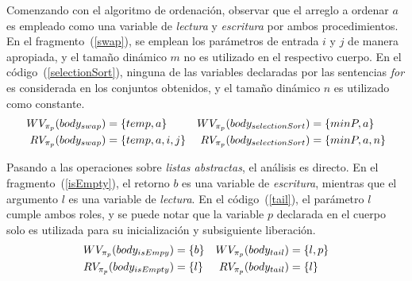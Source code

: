 Comenzando con el algoritmo de ordenación, observar que el arreglo a ordenar $a$ es empleado como una variable de \textit{lectura} y \textit{escritura} por ambos procedimientos.
En el fragmento~(\ref{swap}), se emplean los parámetros de entrada $i$ y $j$ de manera apropiada, y el tamaño dinámico $m$ no es utilizado en el respectivo cuerpo.
En el código~(\ref{selectionSort}), ninguna de las variables declaradas por las sentencias \textit{for} es considerada en los conjuntos obtenidos, y el tamaño dinámico $n$ es utilizado como constante.
\begin{align*}
WV_{\pi_{p}}(body_{swap}) &= \{ temp, a \}
&
WV_{\pi_{p}}(body_{selectionSort}) &= \{ minP, a \}
\\
RV_{\pi_{p}}(body_{swap}) &= \{ temp, a, i, j \}
&
RV_{\pi_{p}}(body_{selectionSort}) &= \{ minP, a, n \}
\end{align*}

Pasando a las operaciones sobre \textit{listas abstractas}, el análisis es directo.
En el fragmento~(\ref{isEmpty}), el retorno $b$ es una variable de \textit{escritura}, mientras que el argumento $l$ es una variable de \textit{lectura}.
En el código~(\ref{tail}), el parámetro $l$ cumple ambos roles, y se puede notar que la variable $p$ declarada en el cuerpo solo es utilizada para su inicialización y subsiguiente liberación.
\begin{align*}
WV_{\pi_{p}}(body_{isEmpy}) &= \{ b \}
&
WV_{\pi_{p}}(body_{tail}) &= \{ l, p \}
\\
RV_{\pi_{p}}(body_{isEmpty}) &= \{ l \}
&
RV_{\pi_{p}}(body_{tail}) &= \{ l \}
\end{align*}





